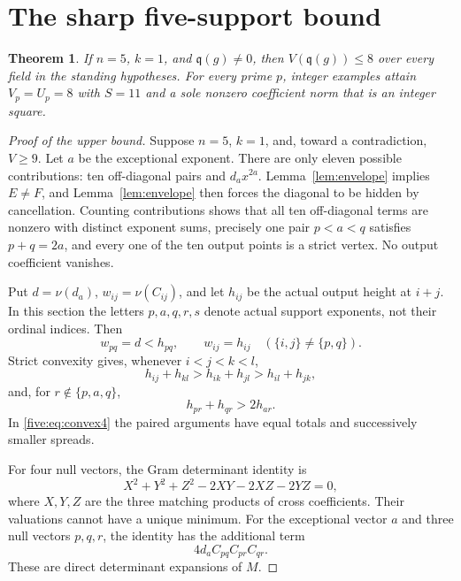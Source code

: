 \documentclass[11pt]{article}
\newtheorem{theorem}{Theorem}[section]
\theoremstyle{remark}\newtheorem{remark}[theorem]{Remark}
\newcommand{\val}{\nu}
\newcommand{\qf}{\mathfrak q}
\begin{document}
\section{The sharp five-support bound}\label{sec:five}

\begin{theorem}\label{thm:five}
If $n=5$, $k=1$, and $\qf(g)\ne0$, then $V(\qf(g))\le8$ over
every field in the standing hypotheses. For every prime $p$, integer
examples attain $V_p=U_p=8$ with $S=11$ and a sole nonzero coefficient
norm that is an integer square.
\end{theorem}

\begin{proof}[Proof of the upper bound]
Suppose $n=5$, $k=1$, and, toward a contradiction, $V\geq9$.
Let $a$ be the exceptional exponent. There are only eleven possible
contributions: ten off-diagonal pairs and $d_a x^{2a}$.
Lemma~\ref{lem:envelope} implies $E\neq F$, and Lemma~\ref{lem:envelope}
then forces the diagonal to be hidden by cancellation.
Counting contributions shows that all ten off-diagonal terms are
nonzero with distinct exponent sums, precisely one pair
$p<a<q$ satisfies $p+q=2a$, and every one of the ten output points is
a strict vertex. No output coefficient vanishes.

Put $d=\val(d_a)$, $w_{ij}=\val(C_{ij})$, and let $h_{ij}$ be the
actual output height at $i+j$. In this section the letters $p,a,q,r,s$ denote actual support exponents, not their ordinal indices. Then
\begin{equation}\label{five:eq:onecollision}
 w_{pq}=d<h_{pq},\qquad w_{ij}=h_{ij}\quad(\{i,j\}\neq\{p,q\}).
\end{equation}
Strict convexity gives, whenever $i<j<k<l$,
\begin{equation}\label{five:eq:convex4}
 h_{ij}+h_{kl}>h_{ik}+h_{jl}>h_{il}+h_{jk},
\end{equation}
and, for $r\notin\{p,a,q\}$,
\begin{equation}\label{five:eq:midpoint}
 h_{pr}+h_{qr}>2h_{ar}.
\end{equation}
In \eqref{five:eq:convex4} the paired arguments have equal totals and
successively smaller spreads.

For four null vectors, the Gram determinant identity is
\begin{equation}\label{five:eq:gramnull}
 X^2+Y^2+Z^2-2XY-2XZ-2YZ=0,
\end{equation}
where $X,Y,Z$ are the three matching products of cross coefficients.
Their valuations cannot have a unique minimum.
For the exceptional vector $a$ and three null vectors $p,q,r$, the
identity has the additional term
\begin{equation}\label{five:eq:gramexception}
 4d_a C_{pq}C_{pr}C_{qr}.
\end{equation}
These are direct determinant expansions of $M$.


\end{proof}
\end{document}
